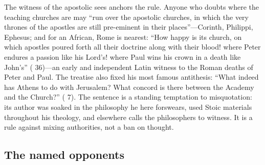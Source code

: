 The witness of the apostolic sees anchors the rule. Anyone who doubts where
the teaching churches are may ``run over the apostolic churches, in which
the very thrones of the apostles are still pre-eminent in their
places''---Corinth, Philippi, Ephesus; and for an African, Rome is nearest:
``How happy is its church, on which apostles poured forth all their doctrine
along with their blood! where Peter endures a passion like his Lord's! where
Paul wins his crown in a death like John's'' ( 36)---an
early and independent Latin witness to the Roman deaths of Peter and Paul. The
treatise also fixed his most famous antithesis: ``What indeed has Athens to do
with Jerusalem? What concord is there between the Academy and the Church?''
( 7). The sentence is a standing temptation to
misquotation: its author was soaked in the philosophy he here forswears, used
Stoic materials throughout his theology, and elsewhere calls the philosophers
to witness. It is a rule against mixing authorities, not a ban on thought.

\subsection{The named opponents}

